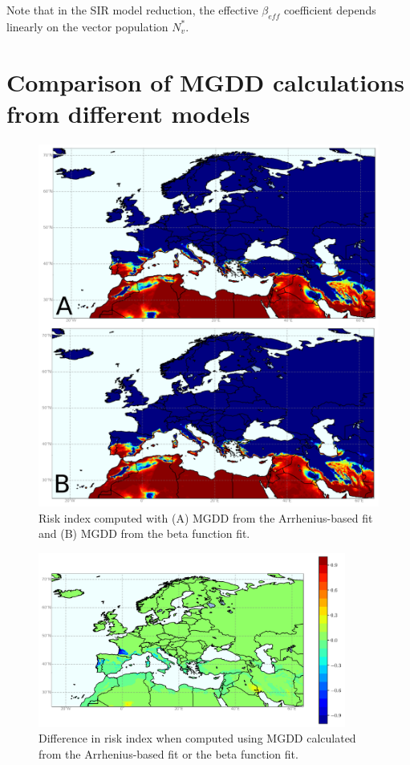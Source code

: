 Note that in the SIR model reduction, the effective $\beta_{eff}$
coefficient depends linearly on the vector population $N_v^*$.

\section{Comparison of MGDD calculations from different models}

\begin{figure}[H]
    \centering
    \includegraphics[width=\textwidth]{Figures/Risk_risk_beta.png}
    \caption{Risk index computed with (A) MGDD from the Arrhenius-based fit and
        (B) MGDD from the beta function fit.}
    \label{fig:R2} %
\end{figure}

\begin{figure}[H]
    \centering

    \includegraphics[width=0.9\textwidth]{Figures/Diff_risk_beta_minus_risk.png}
    \caption{Difference in risk index when computed using MGDD calculated from
        the Arrhenius-based fit or the beta function fit.}
    \label{fig:R3} %
\end{figure}

